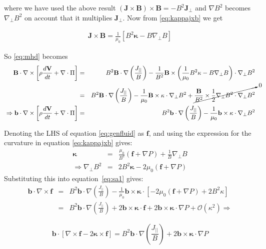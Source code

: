 \documentclass[12pt, a4paper]{article}
\newcommand{\Vec}[1]{\ensuremath{\mathbf{#1}}}
\newcommand{\Bvec}{\Vec{B}}
\newcommand{\Jvec}{\Vec{J}}
\newcommand{\Div}[1]{\ensuremath{\nabla\cdot #1 }}
\newcommand{\Curl}[1]{\ensuremath{\nabla\times #1 }}
\begin{document}
where we have used the above result $\left(\Jvec\times\Bvec\right)\times\Bvec=-{B^2}\Jvec_\perp$ and $\nabla B^2$ becomes $\nabla_\perp B^2$ on account that it multiplies $\Jvec_\perp$. Now from \ref{eq:kappajxb} we get 

\begin{eqnarray}
\Jvec\times\Bvec = \frac{1}{\mu_0}\left[B^2\Vec{\kappa} - B\nabla_\perp B\right]
\end{eqnarray}

So \ref{eq:mhd} becomes
\begin{eqnarray}
\Bvec\cdot\nabla\times\left[\rho\frac{d\Vec{V}}{dt} + \Div{\Pi}\right]& = &B^2\Bvec\cdot\nabla\left(\frac{J_{||}}{B}\right) -\frac{1}{B^2} \Bvec\times\left(\frac{1}{\mu_0}{B^2}\Vec{\kappa}-{B}\nabla_\perp B\right)\cdot\nabla_\perp B^2 \nonumber \\
&=&B^2\Bvec\cdot\nabla\left(\frac{J_{||}}{B}\right)-\frac{1}{\mu_0}\Bvec\times\Vec{\kappa}\cdot\nabla_\perp B^2+\cancelto{0}{\frac{\Bvec}{B^2}\times \frac{1}{2}\nabla_\perp B^2\cdot\nabla_\perp B^2} \nonumber \\\
\Rightarrow \Vec{b}\cdot\nabla\times\left[\rho\frac{d\Vec{V}}{dt} + \Div{\Pi}\right] &=& B^2\Vec{b}\cdot\nabla\left(\frac{J_{||}}{B}\right) - \frac{1}{\mu_0}\Vec{b}\times\Vec{\kappa}\cdot\nabla_\perp B^2
\label{eq:sa1}
\end{eqnarray}

Denoting the LHS of equation \ref{eq:genfluid} as $\Vec{f}$, and using the expression
for the curvature in equation \ref{eq:kappajxb} gives:
\begin{eqnarray*}
\Vec{\kappa} &=& \frac{\mu_0}{B^2}\left(\Vec{f} + \nabla P\right) + \frac{1}{B}\nabla_\perp B \\
\Rightarrow \nabla_\perp B^2 &=& 2B^2\Vec{\kappa} - 2\mu_0\left(\Vec{f} + \nabla P\right)
\end{eqnarray*}
Substituting this into equation~\ref{eq:sa1} gives:
\begin{eqnarray*}
\Vec{b}\cdot\Curl{\Vec{f}} &=& B^2\Vec{b}\cdot\nabla\left(\frac{J_{||}}{B}\right) - \frac{1}{\mu_0}\Vec{b}\times\Vec{\kappa}\cdot\left[-2\mu_0\left(\Vec{f} + \nabla P\right) + 2B^2\kappa\right] \\
&=& B^2\Vec{b}\cdot\nabla\left(\frac{J_{||}}{B}\right) + 2\Vec{b}\times\Vec{\kappa}\cdot\Vec{f} + 2\Vec{b}\times\Vec{\kappa}\cdot\nabla P+\mathcal{O} (\kappa^2) \Rightarrow
\end{eqnarray*}

\begin{equation}
\Vec{b}\cdot\left[\Curl{\Vec{f}} - 2\Vec{\kappa}\times\Vec{f}\right] = B^2\Vec{b}\cdot\nabla\left(\frac{J_{||}}{B}\right) + 2\Vec{b}\times\Vec{\kappa}\cdot\nabla P
\label{eq:shearalfven}
\end{equation}
\end{document}
